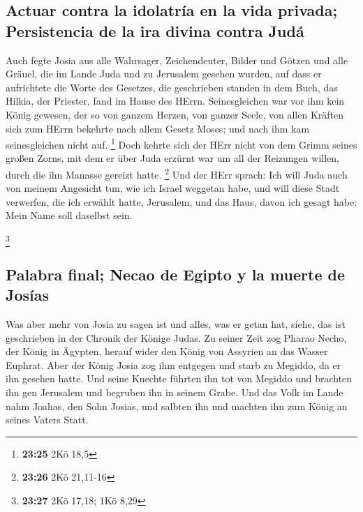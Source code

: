 \hypertarget{actuar-contra-la-idolatruxeda-en-la-vida-privada-persistencia-de-la-ira-divina-contra-juduxe1}{%
\subsection{Actuar contra la idolatría en la vida privada; Persistencia
de la ira divina contra
Judá}\label{actuar-contra-la-idolatruxeda-en-la-vida-privada-persistencia-de-la-ira-divina-contra-juduxe1}}

 Auch fegte Josia aus alle Wahrsager, Zeichendeuter,
Bilder und Götzen und alle Gräuel, die im Lande Juda und zu Jerusalem
gesehen wurden, auf dass er aufrichtete die Worte des Gesetzes, die
geschrieben standen in dem Buch, das Hilkia, der Priester, fand im Hause
des HErrn.  Seinesgleichen war vor ihm kein König
gewesen, der so von ganzem Herzen, von ganzer Seele, von allen Kräften
sich zum HErrn bekehrte nach allem Gesetz Moses; und nach ihm kam
seinesgleichen nicht auf. \footnote{\textbf{23:25} 2Kö 18,5}
 Doch kehrte sich der HErr nicht von dem Grimm seines
großen Zorns, mit dem er über Juda erzürnt war um all der Reizungen
willen, durch die ihn Manasse gereizt hatte. \footnote{\textbf{23:26}
  2Kö 21,11-16}  Und der HErr sprach: Ich will Juda auch
von meinem Angesicht tun, wie ich Israel weggetan habe, und will diese
Stadt verwerfen, die ich erwählt hatte, Jerusalem, und das Haus, davon
ich gesagt habe: Mein Name soll daselbst sein.

\footnote{\textbf{23:27} 2Kö 17,18; 1Kö 8,29}

\hypertarget{palabra-final-necao-de-egipto-y-la-muerte-de-josuxedas}{%
\subsection{Palabra final; Necao de Egipto y la muerte de
Josías}\label{palabra-final-necao-de-egipto-y-la-muerte-de-josuxedas}}

 Was aber mehr von Josia zu sagen ist und alles, was er
getan hat, siehe, das ist geschrieben in der Chronik der Könige Judas.
 Zu seiner Zeit zog Pharao Necho, der König in Ägypten,
herauf wider den König von Assyrien an das Wasser Euphrat. Aber der
König Josia zog ihm entgegen und starb zu Megiddo, da er ihn gesehen
hatte.  Und seine Knechte führten ihn tot von Megiddo und
brachten ihn gen Jerusalem und begruben ihn in seinem Grabe. Und das
Volk im Lande nahm Joahas, den Sohn Josias, und salbten ihn und machten
ihn zum König an seines Vaters Statt.

